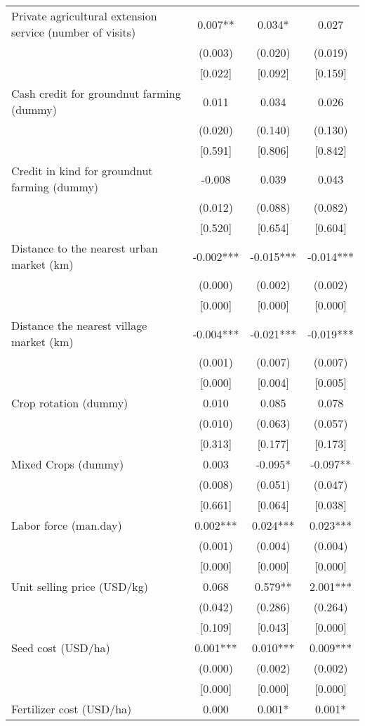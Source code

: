 \documentclass[]{article}
\begin{document}
\begin{tabular}{lccc}
Private agricultural extension service (number of visits) & 0.007** & 0.034* & 0.027 \\
 & (0.003) & (0.020) & (0.019) \\
 & [0.022] & [0.092] & [0.159] \\
Cash credit for groundnut farming (dummy) & 0.011 & 0.034 & 0.026 \\
 & (0.020) & (0.140) & (0.130) \\
 & [0.591] & [0.806] & [0.842] \\
Credit in kind for groundnut farming (dummy) & -0.008 & 0.039 & 0.043 \\
 & (0.012) & (0.088) & (0.082) \\
 & [0.520] & [0.654] & [0.604] \\
Distance to the nearest urban market (km) & -0.002*** & -0.015*** & -0.014*** \\
 & (0.000) & (0.002) & (0.002) \\
 & [0.000] & [0.000] & [0.000] \\
Distance the nearest village market (km) & -0.004*** & -0.021*** & -0.019*** \\
 & (0.001) & (0.007) & (0.007) \\
 & [0.000] & [0.004] & [0.005] \\
Crop rotation (dummy) & 0.010 & 0.085 & 0.078 \\
 & (0.010) & (0.063) & (0.057) \\
 & [0.313] & [0.177] & [0.173] \\
Mixed Crops (dummy) & 0.003 & -0.095* & -0.097** \\
 & (0.008) & (0.051) & (0.047) \\
 & [0.661] & [0.064] & [0.038] \\
Labor force (man.day) & 0.002*** & 0.024*** & 0.023*** \\
 & (0.001) & (0.004) & (0.004) \\
 & [0.000] & [0.000] & [0.000] \\
Unit selling price (USD/kg) & 0.068 & 0.579** & 2.001*** \\
 & (0.042) & (0.286) & (0.264) \\
 & [0.109] & [0.043] & [0.000] \\
Seed cost (USD/ha) & 0.001*** & 0.010*** & 0.009*** \\
 & (0.000) & (0.002) & (0.002) \\
 & [0.000] & [0.000] & [0.000] \\
Fertilizer cost (USD/ha) & 0.000 & 0.001* & 0.001* \\

\end{tabular}
\end{document}
